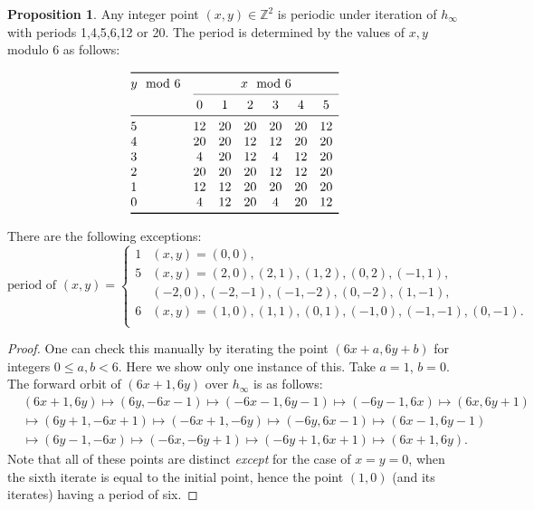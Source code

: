 \documentclass[12pt]{amsart}
\theoremstyle{definition}
\newtheorem{proposition}[theorem]{Proposition}
\begin{document}
\begin{proposition}
		Any integer point $(x,y)\in \mathbb{Z}^2$ is periodic under iteration of $h_{\infty}$ with periods 1,4,5,6,12 or 20. The period is determined by the values of $x,y$ modulo 6 as follows:
		\begin{center}
			\[
			\begin{array}{@{}l*{7}{c}@{}}
				\toprule
				y\mod 6 & \multicolumn{6}{c@{}}{x\mod 6}\\
				\cmidrule(l){2-7}
				& 0 & 1 & 2 & 3 & 4 & 5\\
				\midrule
				5 & 12 & 20 & 20 & 20 & 20 & 12\\
				4 & 20 & 20 & 12 & 12 & 20 & 20\\
				3 & 4 & 20 & 12 & 4 & 12 & 20\\
				2 & 20 & 20 & 20 & 12 & 12 & 20\\
				1 & 12 & 12 & 20 & 20 & 20 & 20\\
				0 & 4 & 12 & 20 & 4 & 20 & 12\\
				\bottomrule
			\end{array}
			\]
		\end{center}
		There are the following exceptions:
		$$ \text{period of }(x,y) = 
		\begin{cases}
			1 & (x,y) = (0,0), \\
			5 & (x,y) = (2,0),(2,1),(1,2),(0,2),(-1,1),\\
			&(-2,0),(-2,-1),(-1,-2),(0,-2),(1,-1), \\
			6 & (x,y) = (1,0),(1,1),(0,1),(-1,0),(-1,-1),(0,-1). \\
		\end{cases} $$

  \label{prop_transc_period}
\end{proposition}
\begin{proof}
		One can check this manually by iterating the point $(6x+a,6y+b)$ for integers $0\leq a,b< 6$. Here we show only one instance of this. Take $a=1$, $b=0$. The forward orbit of $(6x+1,6y)$ over $h_{\infty}$ is as follows:
		\begin{align*}
			&(6x+1,6y)\mapsto (6y,-6x-1)\mapsto (-6x-1,6y-1) \mapsto (-6y-1,6x) \mapsto (6x,6y+1)\\
			& \mapsto (6y+1,-6x+1) \mapsto (-6x+1,-6y) \mapsto (-6y,6x-1)\mapsto (6x-1,6y-1) \\
			&\mapsto (6y-1,-6x) \mapsto (-6x,-6y+1)\mapsto (-6y+1,6x+1) \mapsto (6x+1,6y).
		\end{align*}
		Note that all of these points are distinct \textit{except} for the case of $x=y=0$, when the sixth iterate is equal to the initial point, hence the point $(1,0)$ (and its iterates) having a period of six.
\end{proof}
\end{document}

